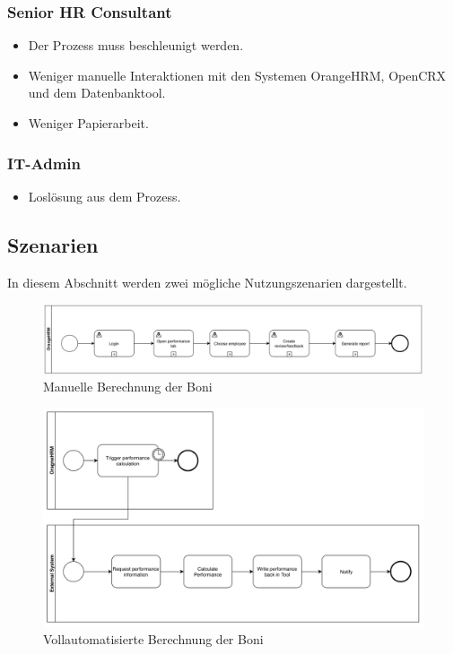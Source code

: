 \documentclass[]{article}
\begin{document}
\subsubsection{Senior HR Consultant}
\begin{itemize}
	\item Der Prozess muss beschleunigt werden.
	\item Weniger manuelle Interaktionen mit den Systemen OrangeHRM, OpenCRX und dem Datenbanktool.
	\item Weniger Papierarbeit.
\end{itemize}

\subsubsection{IT-Admin}
\begin{itemize}
 \item Loslösung aus dem Prozess.
\end{itemize}

\subsection{Szenarien}
In diesem Abschnitt werden zwei mögliche Nutzungszenarien dargestellt.
\begin{figure}
	\centering
	\includegraphics[width=1.0\linewidth]{images/szenario1}
	\caption{Manuelle Berechnung der Boni}
	\label{fig:szenario1}
\end{figure}

\begin{figure}
	\centering
	\includegraphics[width=1.0\linewidth]{images/szenario2}
	\caption{Vollautomatisierte Berechnung der Boni}
	\label{fig:szenario2}
\end{figure}
\end{document}
